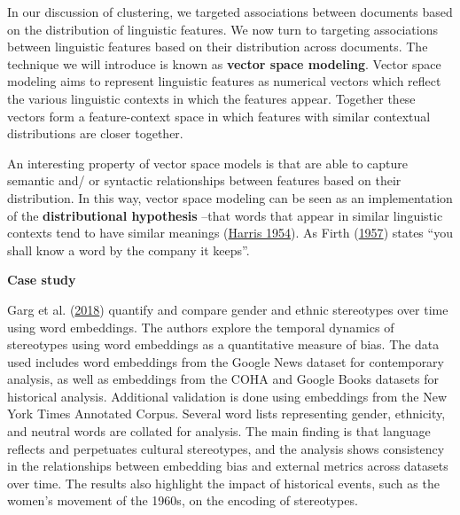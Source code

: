 \documentclass[
  letterpaper,
  DIV=11,
  numbers=noendperiod]{scrreport}
\theoremstyle{definition}
\theoremstyle{remark}
\begin{document}
In our discussion of clustering, we targeted associations between
documents based on the distribution of linguistic features. We now turn
to targeting associations between linguistic features based on their
distribution across documents. The technique we will introduce is known
as \textbf{vector space modeling}. Vector space modeling aims to
represent linguistic features as numerical vectors which reflect the
various linguistic contexts in which the features appear. Together these
vectors form a feature-context space in which features with similar
contextual distributions are closer together.

An interesting property of vector space models is that are able to
capture semantic and/ or syntactic relationships between features based
on their distribution. In this way, vector space modeling can be seen as
an implementation of the \textbf{distributional hypothesis} --that words
that appear in similar linguistic contexts tend to have similar meanings
(\protect\hyperlink{ref-Harris1954}{Harris 1954}). As Firth
(\protect\hyperlink{ref-Firth1957}{1957}) states ``you shall know a word
by the company it keeps''.

\begin{tcolorbox}[enhanced jigsaw, leftrule=.75mm, bottomrule=.15mm, opacityback=0, breakable, left=2mm, colback=white, toprule=.15mm, arc=.35mm, rightrule=.15mm]

\textbf{ Case study}

Garg et al. (\protect\hyperlink{ref-Garg2018}{2018}) quantify and
compare gender and ethnic stereotypes over time using word embeddings.
The authors explore the temporal dynamics of stereotypes using word
embeddings as a quantitative measure of bias. The data used includes
word embeddings from the Google News dataset for contemporary analysis,
as well as embeddings from the COHA and Google Books datasets for
historical analysis. Additional validation is done using embeddings from
the New York Times Annotated Corpus. Several word lists representing
gender, ethnicity, and neutral words are collated for analysis. The main
finding is that language reflects and perpetuates cultural stereotypes,
and the analysis shows consistency in the relationships between
embedding bias and external metrics across datasets over time. The
results also highlight the impact of historical events, such as the
women's movement of the 1960s, on the encoding of stereotypes.

\end{tcolorbox}
\end{document}
